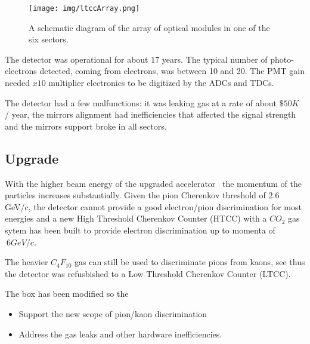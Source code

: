 \begin{figure}
	\centering
	\texttt{[image: img/ltccArray.png]}
	\caption{A schematic diagram of the array of optical modules in one of the six sectors.}
	\label{fig:ltccArray}
\end{figure}

The detector was operational for about $17$ years. The typical number of photo-electrons detected, coming from electrons, was between 10 and 20.
The PMT gain needed $x10$ multiplier electronics to be digitized by the ADCs and TDCs.

The detector had a few malfunctions: it was leaking gas at a rate of about $\$50K$ / year, the mirrors alignment had inefficiencies that affected
the signal strength and the mirrors support broke in all sectors.


\subsection{Upgrade}

With the higher beam energy of the upgraded accelerator~\cite{TDR12} the momentum of the particles increases substantially.
Given the pion Cherenkov threshold of $2.6$ GeV/c, the detector cannot provide a good electron/pion discrimination for most energies and a new
High Threshold Cherenkov Counter (HTCC) with a $CO_2$ gas sytem has been built to provide electron discrimination up to momenta of $~6 GeV/c$.

The heavier $C_4F_{10}$ gas can still be used to discriminate pions from kaons, see  thus the detector was refusbished
to a Low Threshold Cherenkov Counter (LTCC).

The box has been modified so the

\begin{itemize}
	\item Support the new scope of pion/kaon discrimination
	\item Address the gas leaks and other hardware inefficiencies.
\end{itemize}

